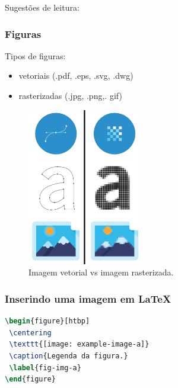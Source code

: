 \begin{frame}
Sugestões de leitura: 
\vspace{2ex}

\vspace{2ex}

\vspace{2ex}

\vspace{2ex}

\vspace{2ex}

\end{frame}


\begin{frame}
\frametitle{Figuras}
Tipos de figuras:
\begin{itemize}
\item vetoriais (.pdf, .eps, .svg, .dwg)
\item rasterizadas (.jpg, .png,. gif)
\end{itemize}
\end{frame}


\begin{frame}
\begin{figure}[h]
 \centering
 \includegraphics[width=0.45\textwidth,height=0.8\textheight,keepaspectratio]{figures/vector-raster.png}
 \caption{Imagem vetorial vs imagem rasterizada.}
 \label{fig-imgvr}
\end{figure}
\end{frame}

\begin{frame}[fragile]
\frametitle{Inserindo uma imagem em \LaTeX{}}
\begin{lstlisting}[language=tex, label=lst-figure, caption={Código para inserir uma figura em \LaTeX{}}, postbreak=\mbox{$\hookrightarrow$\space}, basicstyle=\fontsize{8}{10}\selectfont\ttfamily]
\begin{figure}[htbp]
 \centering
 \texttt{[image: example-image-a]}
 \caption{Legenda da figura.}
 \label{fig-img-a}
\end{figure}
\end{lstlisting}
\end{frame}



